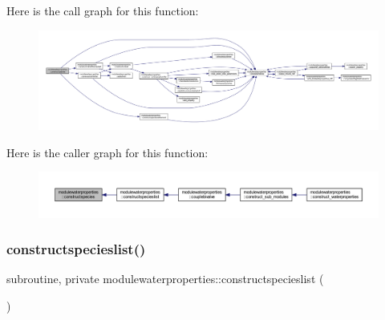 Here is the call graph for this function\+:\nopagebreak
\begin{figure}[H]
\begin{center}
\leavevmode
\includegraphics[width=350pt]{namespacemodulewaterproperties_a34a1aa06efecd62c35348355c7bab36e_cgraph}
\end{center}
\end{figure}
Here is the caller graph for this function\+:\nopagebreak
\begin{figure}[H]
\begin{center}
\leavevmode
\includegraphics[width=350pt]{namespacemodulewaterproperties_a34a1aa06efecd62c35348355c7bab36e_icgraph}
\end{center}
\end{figure}
\mbox{\label{namespacemodulewaterproperties_aab78d8efe1058e8c8918e9ae266897d0}} 
\subsubsection{\texorpdfstring{constructspecieslist()}{constructspecieslist()}}
{\footnotesize\ttfamily subroutine, private modulewaterproperties\+::constructspecieslist (\begin{DoxyParamCaption}{ }\end{DoxyParamCaption})\hspace{0.3cm}{\ttfamily [private]}}

